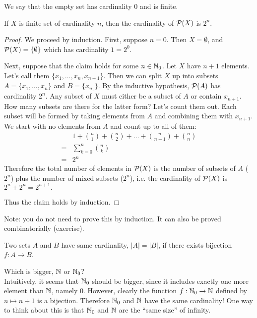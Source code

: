 \documentclass{article}
\begin{document}
We say that the empty set has cardinality 0 and is finite.

\begin{proposition}
 If $X$ is finite set of cardinality $n$, then the cardinality of $\mathcal{P}(X)$ is $2^n$.
\end{proposition}
\begin{proof}
We proceed by induction. First, suppose $n=0$. Then $X = \emptyset$, and $\mathcal{P}(X) = \{ \emptyset \}$ which has cardinality $1 = 2^0$.

Next, suppose that the claim holds for some $n \in {\mathbb{N}}_0$. Let $X$ have $n+1$ elements. Let's call them $\{x_1, \ldots, x_n, x_{n+1}\}$. Then we can split $X$ up into subsets $A=\{x_1, \ldots, x_n\}$ and $B=\{ x_{n_1}\}$. By the inductive hypothesis, $\mathcal{P}(A)$ has cardinality $2^n$. Any subset of $X$ must either be a subset of $A$ or contain $x_{n+1}$. How many subsets are there for the latter form? Let's count them out. Each subset will be formed by taking elements from $A$ and combining them with $x_{n+1}$. We start with no elements from $A$ and count up to all of them:
\begin{align*}
& 1 + \binom{n}{1} + \binom{n}{2} + \ldots + \binom{n}{n-1}  + \binom{n}{n} \\
=& \sum_{k=0}^n \binom{n}{k} \\
=& 2^n
\end{align*}
Therefore the total number of elements in $\mathcal{P}(X)$ is the number of subsets of $A$ ($2^n$) plus the number of mixed subsets ($2^n$), i.e. the cardinality of $\mathcal{P}(X)$ is $2^n+ 2^n = 2^{n+1}.$

Thus the claim holds by induction. 
\end{proof}

Note: you do not need to prove this by induction. It can also be proved combinatorially (exercise).

\begin{definition}
Two sets $A$ and $B$ have same cardinality, $|A| = |B|$, if there exists bijection $f:A \to B$.
\end{definition}

\begin{example}
Which is bigger, ${\mathbb{N}}$ or ${\mathbb{N}}_0$? \\
Intuitively, it seems that ${\mathbb{N}}_0$ should be bigger, since it includes exactly one more element than ${\mathbb{N}}$, namely 0. However, clearly the function $f:{\mathbb{N}}_0 \to {\mathbb{N}}$ defined by $n \mapsto n+1$ is a bijection. Therefore ${\mathbb{N}}_0$ and ${\mathbb{N}}$ have the same cardinality! One way to think about this is that ${\mathbb{N}}_0$ and ${\mathbb{N}}$ are the ``same size'' of infinity. 
\end{example}
\end{document}
